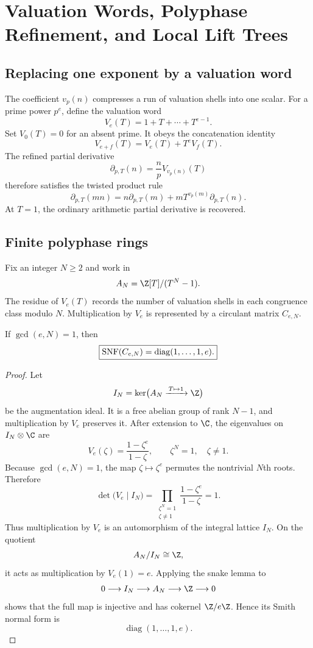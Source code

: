 \clearpage
\section{Valuation Words, Polyphase Refinement, and Local Lift Trees}

\subsection{Replacing one exponent by a valuation word}
The coefficient $v_p(n)$ compresses a run of valuation shells into one scalar. For a prime power $p^e$, define the valuation word
\[
 \boxed{
 V_e(T)=1+T+\cdots+T^{e-1}.
 }
\]
Set $V_0(T)=0$ for an absent prime. It obeys the concatenation identity
\[
 V_{e+f}(T)=V_e(T)+T^eV_f(T).
\]
The refined partial derivative
\[
 \partial_{p,T}(n)
 =
 \frac npV_{v_p(n)}(T)
\]
therefore satisfies the twisted product rule
\[
 \boxed{
 \partial_{p,T}(mn)
 =
 n\partial_{p,T}(m)
 +
 mT^{v_p(m)}\partial_{p,T}(n).
 }
\]
At $T=1$, the ordinary arithmetic partial derivative is recovered.

\subsection{Finite polyphase rings}
Fix an integer $N\ge2$ and work in
\[
 A_N=\Z[T]/(T^N-1).
\]
The residue of $V_e(T)$ records the number of valuation shells in each congruence class modulo $N$. Multiplication by $V_e$ is represented by a circulant matrix $C_{e,N}$.

\begin{theorem}
If $\gcd(e,N)=1$, then
\[
 \boxed{
 \operatorname{SNF}(C_{e,N})
 =
 \operatorname{diag}(1,\ldots,1,e).
 }
\]
\end{theorem}

\begin{proof}
Let
\[
 I_N=\ker\bigl(A_N\xrightarrow{\,T\mapsto1\,}\Z\bigr)
\]
be the augmentation ideal. It is a free abelian group of rank $N-1$, and multiplication by $V_e$ preserves it. After extension to $\C$, the eigenvalues on $I_N\otimes\C$ are
\[
 V_e(\zeta)
 =
 \frac{1-\zeta^e}{1-\zeta},
 \qquad
 \zeta^N=1,
 \quad
 \zeta\neq1.
\]
Because $\gcd(e,N)=1$, the map $\zeta\mapsto\zeta^e$ permutes the nontrivial $N$th roots. Therefore
\[
 \det\bigl(V_e\mid I_N\bigr)
 =
 \prod_{\substack{\zeta^N=1\\\zeta\neq1}}
 \frac{1-\zeta^e}{1-\zeta}
 =1.
\]
Thus multiplication by $V_e$ is an automorphism of the integral lattice $I_N$. On the quotient
\[
 A_N/I_N\cong\Z,
\]
it acts as multiplication by $V_e(1)=e$. Applying the snake lemma to
\[
 0\longrightarrow I_N\longrightarrow A_N\longrightarrow\Z\longrightarrow0
\]
shows that the full map is injective and has cokernel $\Z/e\Z$. Hence its Smith normal form is
\[
 \operatorname{diag}(1,\ldots,1,e).
\]
\end{proof}

